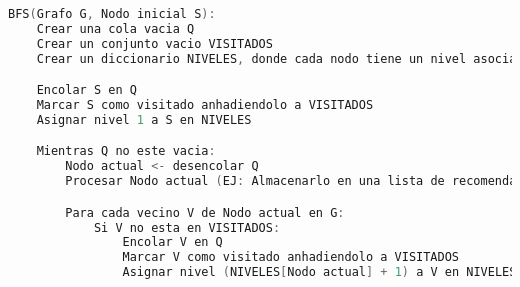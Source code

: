 \begin{lstlisting}[language=C, caption={Pseudocodigo del algoritmo BFS}, label={lst:BFS}]
    BFS(Grafo G, Nodo inicial S):
    Crear una cola vacia Q
    Crear un conjunto vacio VISITADOS
    Crear un diccionario NIVELES, donde cada nodo tiene un nivel asociado

    Encolar S en Q
    Marcar S como visitado anhadiendolo a VISITADOS
    Asignar nivel 1 a S en NIVELES

    Mientras Q no este vacia:
        Nodo actual <- desencolar Q
        Procesar Nodo actual (EJ: Almacenarlo en una lista de recomendaciones)

        Para cada vecino V de Nodo actual en G:
            Si V no esta en VISITADOS:
                Encolar V en Q
                Marcar V como visitado anhadiendolo a VISITADOS
                Asignar nivel (NIVELES[Nodo actual] + 1) a V en NIVELES
\end{lstlisting}